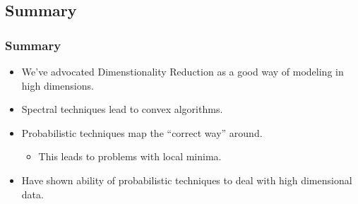 \subsection{Summary}

\begin{frame}
\frametitle{Summary}
\begin{itemize}
\item We've advocated Dimenstionality Reduction as a good way of 
modeling in high dimensions.
\item Spectral techniques lead to convex algorithms.
\item Probabilistic techniques map the ``correct way'' around.

\begin{itemize}
\item This leads to problems with local minima.
\end{itemize}
\item Have shown ability of probabilistic techniques to deal with high dimensional data.
\end{itemize}

\end{frame}

